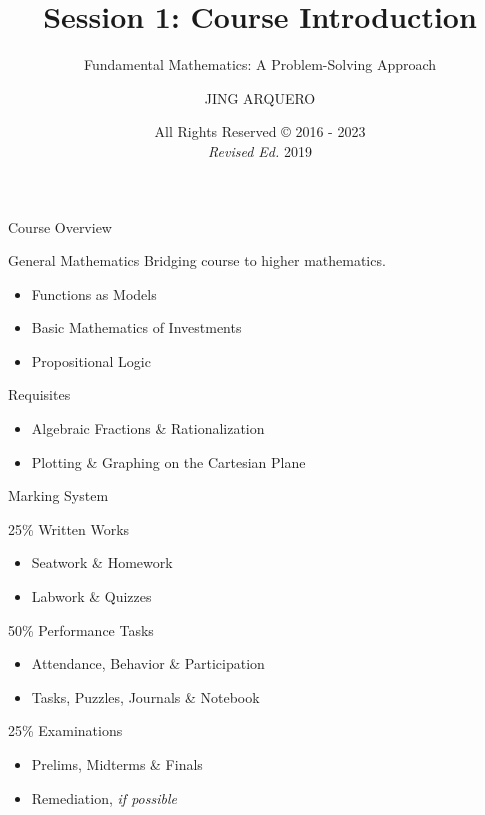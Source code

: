 \documentclass[14pt, aspectratio=169]{beamer}
\begin{document}
\title{Session 1: Course Introduction}
\subtitle{Fundamental Mathematics: A Problem-Solving Approach}
\author{JING ARQUERO}
\date{All Rights Reserved {\textrm \copyright} 2016 - 2023 \\ \textit{Revised Ed.} 2019}

\begin{frame}
 \maketitle
\end{frame}

\begin{frame}{Course Overview}
    \begin{block}{General Mathematics}
    Bridging course to higher mathematics.
    \begin{itemize}
            \item Functions as Models
            \item Basic Mathematics of Investments
            \item Propositional Logic
        \end{itemize}
    \end{block}

    Requisites
    \begin{itemize}
     \item Algebraic Fractions \& Rationalization
     \item Plotting \& Graphing on the Cartesian Plane
    \end{itemize}

\end{frame}

\begin{frame}{Marking System}
  \begin{block}{25\% Written Works}
   \begin{itemize}
    \item Seatwork \& Homework
    \item Labwork \& Quizzes
   \end{itemize}
  \end{block}

  \begin{block}{50\% Performance Tasks}
  \begin{itemize}
   \item Attendance, Behavior \& Participation
   \item Tasks, Puzzles, Journals \& Notebook
  \end{itemize}
  \end{block}

  \begin{block}{25\% Examinations}
   \begin{itemize}
    \item Prelims, Midterms \& Finals
    \item Remediation, \textit{if possible}
   \end{itemize}
  \end{block}
\end{frame}
\end{document}
